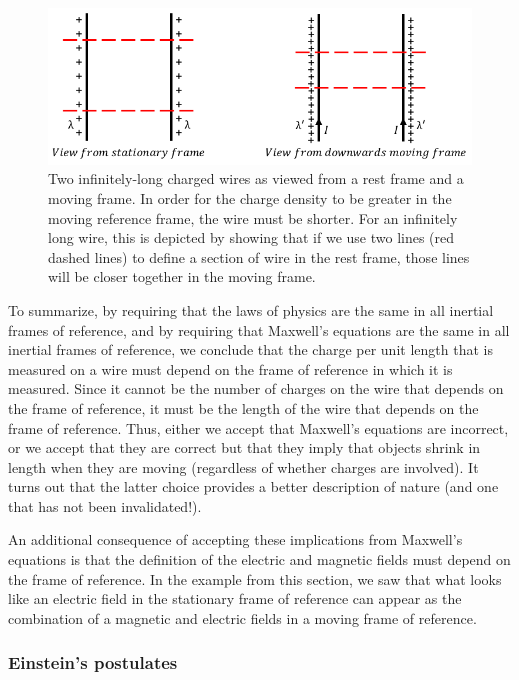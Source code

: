 \begin{figure}[!htbp]
\centering
\includegraphics[width=0.8\linewidth]{files/twowire_chargedensit-b5a881d42989d15971cd5cefb0e170e2.png}
\caption[]{Two infinitely-long charged wires as viewed from a rest frame and a moving frame. In order for the charge density to be greater in the moving reference frame, the wire must be shorter. For an infinitely long wire, this is depicted by showing that if we use two lines (red dashed lines) to define a section of wire in the rest frame, those lines will be closer together in the moving frame.}
\label{fig:specialrelativity:twowire_chargedensity}
\end{figure}

To summarize, by requiring that the laws of physics are the same in all inertial frames of reference, and by requiring that Maxwell's equations are the same in all inertial frames of reference, we conclude that the charge per unit length that is measured on a wire must depend on the frame of reference in which it is measured. Since it cannot be the number of charges on the wire that depends on the frame of reference, it must be the length of the wire that depends on the frame of reference. Thus, either we accept that Maxwell's equations are incorrect, or we accept that they are correct but that they imply that objects shrink in length when they are moving (regardless of whether charges are involved). It turns out that the latter choice provides a better description of nature (and one that has not been invalidated!).

An additional consequence of accepting these implications from Maxwell's equations is that the definition of the electric and magnetic fields must depend on the frame of reference. In the example from this section, we saw that what looks like an electric field in the stationary frame of reference can appear as the combination of a magnetic and electric fields in a moving frame of reference.

\subsubsection{Einstein's postulates}

